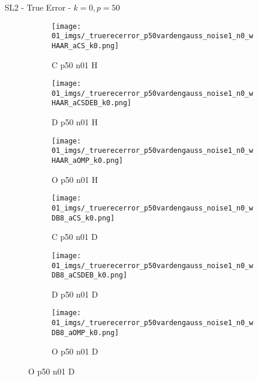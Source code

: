 \begin{frame}{SL2 - True Error - $k=0,p=50$}{}
\begin{figure}
\begin{subfigure}{0.13\textwidth}
\texttt{[image: 01\_imgs/\_truerecerror\_p50vardengauss\_noise1\_n0\_wHAAR\_aCS\_k0.png]}
\caption*{\tiny C p50 n01 H}
\end{subfigure}
\begin{subfigure}{0.13\textwidth}
\texttt{[image: 01\_imgs/\_truerecerror\_p50vardengauss\_noise1\_n0\_wHAAR\_aCSDEB\_k0.png]}
\caption*{\tiny D p50 n01 H}
\end{subfigure}
\begin{subfigure}{0.13\textwidth}
\texttt{[image: 01\_imgs/\_truerecerror\_p50vardengauss\_noise1\_n0\_wHAAR\_aOMP\_k0.png]}
\caption*{\tiny O p50 n01 H}
\end{subfigure}
\begin{subfigure}{0.13\textwidth}
\texttt{[image: 01\_imgs/\_truerecerror\_p50vardengauss\_noise1\_n0\_wDB8\_aCS\_k0.png]}
\caption*{\tiny C p50 n01 D}
\end{subfigure}
\begin{subfigure}{0.13\textwidth}
\texttt{[image: 01\_imgs/\_truerecerror\_p50vardengauss\_noise1\_n0\_wDB8\_aCSDEB\_k0.png]}
\caption*{\tiny D p50 n01 D}
\end{subfigure}
\begin{subfigure}{0.13\textwidth}
\texttt{[image: 01\_imgs/\_truerecerror\_p50vardengauss\_noise1\_n0\_wDB8\_aOMP\_k0.png]}
\caption*{\tiny O p50 n01 D}
\end{subfigure}

\vspace{5pt}


\end{figure}
\end{frame}
